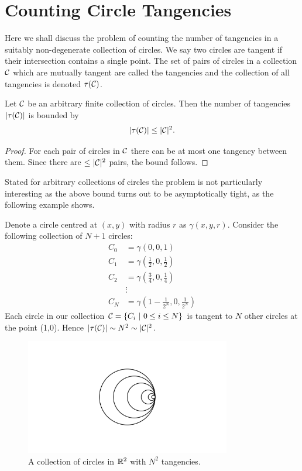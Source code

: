\chapter{Counting Circle Tangencies\label{chap:circle}}

Here we shall discuss the problem of counting the number of tangencies in a suitably non-degenerate collection of circles. We say two circles are tangent if their intersection contains a single point.
The set of pairs of circles in a collection $\mathcal C$ which are mutually tangent are called the tangencies and the collection of all tangencies is denoted $\tau(\mathcal C)$. 

\begin{lemma} \label{lem:trivial-circle-bound}
    Let $\mathcal C$ be an arbitrary finite collection of circles. Then the number of tangencies $|\tau(\mathcal C)|$ is bounded by
    \[
        |\tau(\mathcal C)| \leq |\mathcal C|^2.
    \] 
\end{lemma}
\begin{proof}
    For each pair of circles in $\mathcal C$ there can be at most one tangency between them.
    Since there are $\leq |\mathcal C|^2$ pairs, the bound follows.
\end{proof}
Stated for arbitrary collections of circles the problem is not particularly interesting as the above bound turns out to be asymptotically tight, as the following example shows.
\begin{example}
Denote a circle centred at $(x,y)$ with radius $r$ as $\gamma (x,y,r)$.
Consider the following collection of $N+1$ circles:
\begin{align*}
    C_0 &= \gamma\left(0,0,1\right) \\
    C_1 &= \gamma\left(\frac{1}{2},0,\frac{1}{2}\right) \\
    C_2 &= \gamma\left(\frac{3}{4},0, \frac{1}{4}\right) \\
    &\vdots \\
    C_N &= \gamma\left(1- \frac{1}{2^N}, 0, \frac{1}{2^N}\right)
\end{align*}
Each circle in our collection $\mathcal C = \{ C_i \ | \ 0 \leq i \leq N\}$ is tangent to $N$ other circles at the point (1,0). 
Hence $|\tau(\mathcal C)| \sim N^2 \sim |\mathcal C|^2$. 
\begin{figure}[h]
    \centering 
    \includegraphics[width=0.8\textwidth]{images/circles_degen_case_ManimCE_v0.15.1.png}
    \caption{A collection of circles in $\mathbb R^2$ with $N^2$ tangencies.}
    \end{figure}
\end{example}

